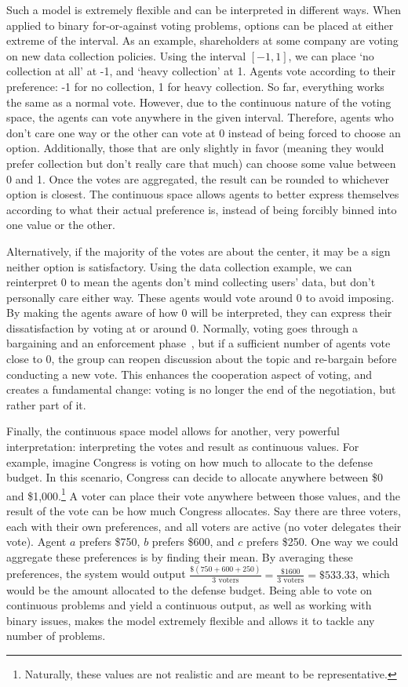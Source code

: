 Such a model is extremely flexible and can be interpreted in different ways.
When applied to binary for-or-against voting problems, options can be placed at either
extreme of the interval.
As an example, shareholders at some company are voting on new data collection policies.
Using the interval $[-1, 1]$, we can place `no collection at all' at -1, and `heavy
collection' at 1.
Agents vote according to their preference: -1 for no collection, 1 for heavy collection.
So far, everything works the same as a normal vote.
However, due to the continuous nature of the voting space, the agents can vote
anywhere in the given interval.
Therefore, agents who don't care one way or the other can vote at 0 instead of being
forced to choose an option.
Additionally, those that are only slightly in favor (meaning they would prefer
collection but don't really care that much) can choose some value between 0 and 1.
Once the votes are aggregated, the result can be rounded to whichever option is
closest.
The continuous space allows agents to better express themselves according to what
their actual preference is, instead of being forcibly binned into one value or the
other.

Alternatively, if the majority of the votes are about the center, it may be a sign
neither option is satisfactory.
Using the data collection example, we can reinterpret 0 to mean the agents don't
mind collecting users' data, but don't personally care either way.
These agents would vote around 0 to avoid imposing.
By making the agents aware of how 0 will be interpreted, they can express their
dissatisfaction by voting at or around 0.
Normally, voting goes through a bargaining and an enforcement
phase~\cite{Fearon1998}, but if a sufficient number of agents vote close to 0, the
group can reopen discussion about the topic and re-bargain before conducting a new vote.
This enhances the cooperation aspect of voting, and creates a fundamental change:
voting is no longer the end of the negotiation, but rather part of it.

Finally, the continuous space model allows for another, very powerful interpretation:
interpreting the votes and result as continuous values.
For example, imagine Congress is voting on how much to allocate to the defense budget.
In this scenario, Congress can decide to allocate anywhere between \$0 and \$1,000.\footnote{
    Naturally, these values are not realistic and are meant to be representative.
}
A voter can place their vote anywhere between those values, and the result of the
vote can be how much Congress allocates.
Say there are three voters, each with their own preferences, and all voters are
active (no voter delegates their vote).
Agent $a$ prefers \$750, $b$ prefers \$600, and $c$ prefers \$250.
One way we could aggregate these preferences is by finding their mean.
By averaging these preferences, the system would output
$\frac{\$(750 + 600 + 250)}{3 \text{ voters}} = \frac{\$1600}{3 \text{ voters}} =
\$533.33$,
which would be the amount allocated to the defense budget.
Being able to vote on continuous problems and yield a continuous output, as well as
working with binary issues, makes the model extremely flexible and allows it to
tackle any number of problems.

